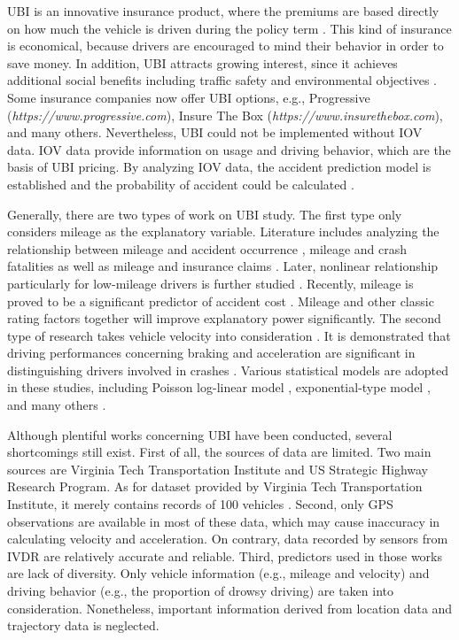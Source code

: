 \documentclass[sii]{ipart}
\theoremstyle{plain}
\begin{document}
UBI is an innovative insurance product, where the premiums are based directly on how much the vehicle is driven during the policy term \cite{litman2011distance}. This kind of insurance is economical, because drivers are encouraged to mind their behavior in order to save money. In addition, UBI attracts growing interest, since it achieves additional social benefits including traffic safety and environmental objectives \cite{bolderdijk2011effects, parry2005pay}. Some insurance companies now offer UBI options, e.g., Progressive ({\it https://www.progressive.com}),  Insure The Box ({\it https://www.insurethebox.com}), and many others. Nevertheless, UBI could not be implemented without IOV data. IOV data provide information on usage and driving behavior, which are the basis of UBI pricing. By analyzing IOV data, the accident prediction model is established and the probability of accident could be calculated \cite{paefgen2014multivariate, wu2012crashes, ayusoanalyzing}.



Generally, there are two types of work on UBI study. The first type only considers mileage as the explanatory variable. Literature includes analyzing the relationship between mileage and accident occurrence \cite{lourens1999annual}, mileage and crash fatalities \cite{litman2011distance} as well as mileage and insurance claims \cite{bordoff2008pay, ferreira2010pay}. Later, nonlinear relationship particularly for low-mileage drivers is further studied \cite{staplin2008low, langford2008defence}. Recently, mileage is proved to be a significant predictor of accident cost \cite{ferreira2012measuring}. Mileage and other classic rating factors together will improve explanatory power significantly. The second type of research takes vehicle velocity into consideration \cite{kloeden2002reanalysis, jun2007relationships, brijs2006impact}. It is demonstrated that driving performances concerning braking and acceleration are significant in distinguishing drivers involved in crashes \cite{jun2007relationships}. Various statistical models are adopted in these studies, including Poisson log-linear model \cite{gordon2011analysis}, exponential-type model \cite{ayusoanalyzing}, and many others  \cite{paefgen2014multivariate, paefgen2013evaluation}.


Although plentiful works concerning UBI have been conducted, several shortcomings still exist. First of all, the sources of data are limited. Two main sources are Virginia Tech Transportation Institute and US Strategic Highway Research Program. As for dataset provided by Virginia Tech Transportation Institute, it merely contains records of 100 vehicles \cite{dingus2006100}. Second, only GPS observations are available in most of these data, which may cause inaccuracy in calculating velocity and acceleration. On contrary, data recorded by sensors from IVDR are relatively accurate and reliable. Third, predictors used in those works are lack of diversity. Only vehicle information (e.g., mileage and velocity) and driving behavior (e.g., the proportion of drowsy driving) are taken into consideration. Nonetheless, important information derived from location data and trajectory data is neglected.
\end{document}
